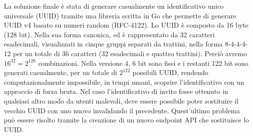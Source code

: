 \documentclass[main.tex]{subfiles}
\begin{document}
La soluzione finale è stata di generare casualmente un identificativo unico universale (UUID) tramite una libreria scritta in Go che permette di generare UUID v4 basato su numeri random (RFC-4122)\cite{UUID-library-documentation}. 
Lo UUID è composto da 16 byte (128 bit). Nella sua forma canonica, ed è rappresentato da 32 caratteri esadecimali, visualizzati in cinque gruppi separati da trattini, nella forma 8-4-4-4-12 per un totale di 36 caratteri (32 esadecimali e quattro trattini)\cite{GenerateUUID}\cite{rfc4122}. Perciò avremo \( 16^{32}=2^{128} \) combinazioni. Nella versione 4, 6 bit sono fissi e i restanti 122 bit sono generati casualmente, per un totale di \(2^{122}\) possibili UUID\cite{UUIDv4}, rendendo computazionalmente impossibile, in tempi umani, scoprire l'identificativo con un approccio di forza bruta. %
\newline
Nel caso l'identificativo di invito fosse ottenuto in qualsiasi altro modo da utenti malevoli, deve essere possibile poter sostituire il vecchio UUID con uno nuovo invalidando il precedente.
\newline
Quest'ultimo problema può essere risolto tramite la creazione di un nuovo endpoint API che sostituisce lo UUID.
\end{document}
